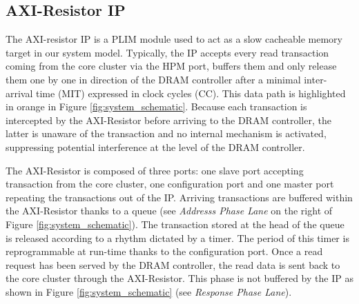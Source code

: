     \subsection{AXI-Resistor IP}
        \label{subsec:axi-resistor}
        The AXI-resistor IP is a PLIM module \cite{PLIM20} used to act as a slow cacheable memory target in our system model.
        Typically, the IP accepts every read transaction coming from the core cluster via the HPM port, buffers them and only release them one by one in direction of the DRAM controller after a minimal inter-arrival time (MIT) expressed in clock cycles (CC).
        This data path is highlighted in orange in Figure \ref{fig:system_schematic}.
        Because each transaction is intercepted by the AXI-Resistor before arriving to the DRAM controller, the latter is unaware of the transaction and no internal mechanism is activated, suppressing potential interference at the level of the DRAM controller.

        The AXI-Resistor is composed of three ports: one slave port accepting transaction from the core cluster, one configuration port and one master port repeating the transactions out of the IP.
        Arriving transactions are buffered within the AXI-Resistor thanks to a queue (see \emph{Addresss Phase Lane} on the right of Figure \ref{fig:system_schematic}).
        The transaction stored at the head of the queue is released according to a rhythm dictated by a timer.
        The period of this timer is reprogrammable at run-time thanks to the configuration port.
        Once a read request has been served by the DRAM controller, the read data is sent back to the core cluster through the AXI-Resistor.
        This phase is not buffered by the IP as shown in Figure \ref{fig:system_schematic} (see \emph{Response Phase Lane}).
